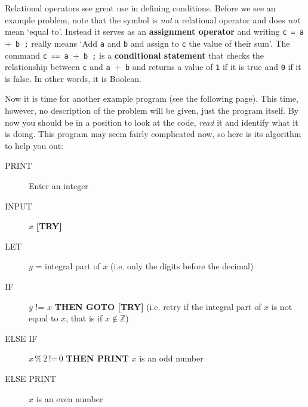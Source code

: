 \documentclass[11pt,oneside]{article}
\begin{document}
{{{{{{{{{Relational operators see great use in defining  conditions. Before we see an example problem, note that the \cbox{=} symbol is \textit{not} a relational operator and does \textit{not} mean `equal to'. Instead it serves as an \textbf{assignment operator} and writing \verb+c = a ++\verb+ b ;+ really means `Add \verb+a+ and \verb+b+ and assign to \verb+c+ the value of their sum'. The command \verb+c == a ++\verb+ b ;+ is a \textbf{conditional statement} that checks the relationship between \verb+c+ and \verb+a ++\verb+ b+ and returns a value of \verb+1+ if it is true and \verb+0+ if it is false. In other words, it is Boolean.

Now it is time for another example program (see the following page). This time, however, no description of the problem will be given, just the program itself. By now you should be in a position to look at the code, \textit{read} it and identify what it is doing. This program may seem fairly complicated now, so here is its algorithm to help you out:
\begin{description}
\item[\qquad \footnotesize\sffamily{} PRINT] Enter an integer \\[-1.75em]
\item[\qquad \footnotesize\sffamily{} INPUT] $x$ \quad\textbf{\footnotesize\sffamily{} [TRY]}\\[-1.75em]
\item[\qquad \footnotesize\sffamily{} LET] $y$ = integral part of $x$ (i.e. only the digits before the decimal) \\[-1.75em]
\item[\qquad \footnotesize\sffamily{} IF] $y$ != $x$ \textbf{\footnotesize\sffamily{} THEN GOTO  [TRY]} (i.e. retry if the integral part of $x$ is not equal to $x$, that is if $x \notin \mathbb{Z}$)\\[-1.75em]
\item[\qquad\footnotesize\sffamily{} ELSE \quad IF] $x \,\%\, 2$\,!=\,$0$ \textbf{\footnotesize\sffamily{} THEN PRINT} $x$ is an odd number \\[-1.75em]
\item[\qquad\qquad\;\;\; \footnotesize\sffamily{} ELSE PRINT] $x$ is an even number
\end{description}

}}}}}}}}}
\end{document}
